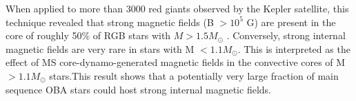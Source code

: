 When applied to more than 3000 red giants observed by the Kepler satellite, this technique revealed that strong magnetic fields (B $> 10^5$ G) are present in the core of roughly 50\% of RGB stars with $M > 1.5M_\odot$ \citep{Stello_2016,Stello_2016a}. Conversely, strong internal magnetic fields are very rare in stars with M $< 1.1M_\odot$. This is interpreted as the
effect of MS core-dynamo-generated magnetic fields in the convective cores of M $> 1.1M_\odot$ stars.This result shows that a potentially very large fraction of main sequence OBA stars could host strong internal magnetic fields.



